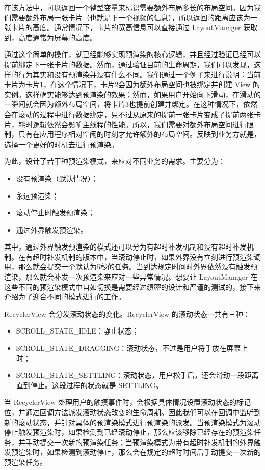 在该方法中，可以返回一个整型变量来标识需要额外布局多长的布局空间。因为我们需要额外布局一张卡片（也就是下一个视频的信息），所以返回的距离应该为一张卡片的高度。通常情况下，卡片的宽高信息可以直接通过 LayoutManager 获取到，高度通常为屏幕的高度。

通过这个简单的操作，就已经能够实现预渲染的核心逻辑，并且经过验证已经可以提前绑定下一张卡片的数据。然而，通过验证目前的生命周期，我们可以发现，这样的行为其实和没有预渲染并没有什么不同。我们通过一个例子来进行说明：当前卡片为卡片1，在这个情况下，卡片2会因为额外布局空间也被绑定并创建 View 的实例。这样确实能够达到预渲染的效果；然而，如果用户开始向下滑动，在滑动的一瞬间就会因为额外布局空间，将卡片3也提前创建并绑定。在这种情况下，依然会在滚动的过程中进行数据绑定，只不过从原来的提前一张卡片变成了提前两张卡片，耗时逻辑依然会影响主线程的性能。所以，我们需要对额外布局空间进行限制，只有在应用程序相对空闲的时刻才允许额外的布局空间。反映到业务方就是，选择一个更好的时机去进行预渲染。

为此，设计了若干种预渲染模式，来应对不同业务的需求。主要分为：

\begin{itemize}
    \item 没有预渲染（默认情况）；
    \item 永远预渲染；
    \item 滚动停止时触发预渲染；
    \item 通过外界触发预渲染。
\end{itemize}

其中，通过外界触发预渲染的模式还可以分为有超时补发机制和没有超时补发机制。在有超时补发机制的版本中，当滚动停止时，如果外界没有立刻进行预渲染调用，那么就会提交一个默认为5秒的任务。当到达规定时间时外界依然没有触发预渲染，那么就会补发一次预渲染来应对一些异常情况。想要让 LayoutManager 在这些不同的预渲染模式中自如切换是需要经过缜密的设计和严谨的测试的，接下来介绍为了迎合不同的模式进行的工作。

RecyclerView 会分发滚动状态的变化。RecyclerView 的滚动状态一共有三种：

\begin{itemize}
    \item SCROLL\_STATE\_IDLE：静止状态；
    \item SCROLL\_STATE\_DRAGGING：滚动状态，不过是用户将手放在屏幕上时；
    \item SCROLL\_STATE\_SETTLING：滚动状态，用户松手后，还会滑动一段距离直到停止。这段过程的状态就是 SETTLING。
\end{itemize}

当 RecyclerView 处理用户的触摸事件时，会根据具体情况设置滚动状态的标记位，并通过回调方法派发滚动状态改变的生命周期。因此我们可以在回调中监听到新的滚动状态，并针对具体的预渲染模式进行预渲染的派发。当预渲染模式为滚动停止触发预渲染时，如果检测到已经滚动停止，那么应该移除已经存在的预渲染任务，并手动提交一次新的预渲染任务；当预渲染模式为带有超时补发机制的外界触发预渲染时，如果检测到滚动停止，那么会在规定的超时时间后手动提交一次新的预渲染任务。

